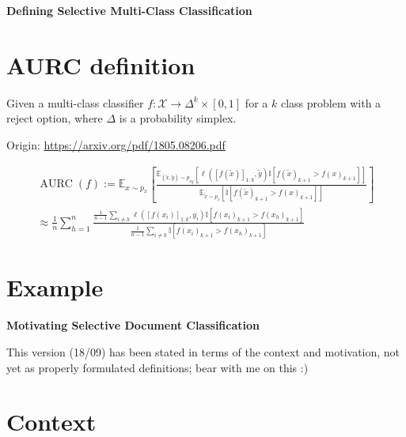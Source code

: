 \begin{center}{\noindent\Large\bf Defining Selective Multi-Class Classification}\end{center}

\section{AURC definition}

Given a multi-class classifier $f: \mathcal{X} \rightarrow \Delta^{k} \times [0,1]$ for a $k$ class problem with a reject option, where $\Delta$ is a probability simplex. %

\noindent Origin: \url{https://arxiv.org/pdf/1805.08206.pdf}

\begin{align}
    \operatorname{AURC}(f) := \mathbb{E}_{x \sim p_x} \left[  \frac{\mathbb{E}_{(\tilde{x},\tilde{y})\sim p_{xy}}[\ell([f(\tilde{x})]_{1:k},\tilde{y}) \mathbb{I}[f(\tilde{x})_{k+1} > f(x)_{k+1}]]}{\mathbb{E}_{\tilde{x}\sim p_{x}}[ \mathbb{I}[f(\tilde{x})_{k+1} > f(x)_{k+1}]]} \right] \\
    \approx \frac{1}{n} \sum_{h=1}^n \frac{\frac{1}{n-1} \sum_{i\neq h} \ell([f(x_i)]_{1:k},y_i) \mathbb{I}[f(x_i)_{k+1} > f(x_h)_{k+1}]}{\frac{1}{n-1} \sum_{i\neq h} \mathbb{I}[f(x_i)_{k+1} > f(x_h)_{k+1}]}
\end{align}

\section{Example \AURC}


\newpage

\begin{center}{\noindent\Large\bf Motivating Selective Document Classification}\end{center}

\begin{uuredbox}
This version (18/09) has been stated in terms of the context and motivation, not yet as properly formulated definitions; bear with me on this :) 
\end{uuredbox}

\section{Context}

